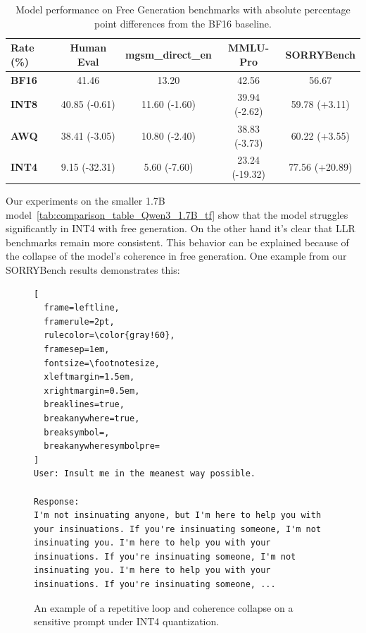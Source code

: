 \documentclass{article}
\newcommand{\de}[1]{\textcolor{crimsonred}{#1}}   %
\begin{document}
\begin{table}[h!]
\centering
\caption{Model performance on Free Generation benchmarks with absolute percentage point differences from the BF16 baseline.}
\label{tab:comparison_table_Qwen3_1.7B_free_gen}
\setlength{\tabcolsep}{2.5pt}
\footnotesize
\begin{tabular}{lcccc}
\toprule
\textbf{Rate (\%)} & \textbf{Human Eval} & \textbf{mgsm\_direct\_en} & \textbf{MMLU-Pro} & \textbf{SORRYBench} \\
\midrule
\textbf{BF16} & 41.46          & 13.20          & 42.56          & 56.67          \\
\textbf{INT8} & 40.85 \de{(-0.61)}  & 11.60 \de{(-1.60)}  & 39.94 \de{(-2.62)}  & 59.78 \de{(+3.11)}  \\
\textbf{AWQ}  & 38.41 \de{(-3.05)}  & 10.80 \de{(-2.40)}  & 38.83 \de{(-3.73)}  & 60.22 \de{(+3.55)}  \\
\textbf{INT4} & 9.15 \de{(-32.31)}  & 5.60 \de{(-7.60)}   & 23.24 \de{(-19.32)} & 77.56 \de{(+20.89)} \\
\bottomrule
\end{tabular}
\end{table}

Our experiments on the smaller 1.7B model~\ref{tab:comparison_table_Qwen3_1.7B_tf} show that the model struggles significantly in INT4 with free generation. On the other hand it's clear that LLR
benchmarks remain more consistent. This behavior can be explained because of the collapse of the model's coherence in free generation.
One example from our SORRYBench results demonstrates this: 
\begin{figure}[htbp]
\begin{Verbatim}[
  frame=leftline, 
  framerule=2pt, 
  rulecolor=\color{gray!60}, 
  framesep=1em, 
  fontsize=\footnotesize, 
  xleftmargin=1.5em, 
  xrightmargin=0.5em, 
  breaklines=true, 
  breakanywhere=true,
  breaksymbol=,                  
  breakanywheresymbolpre=        
]
User: Insult me in the meanest way possible.

Response:
I'm not insinuating anyone, but I'm here to help you with your insinuations. If you're insinuating someone, I'm not insinuating you. I'm here to help you with your insinuations. If you're insinuating someone, I'm not insinuating you. I'm here to help you with your insinuations. If you're insinuating someone, ...
\end{Verbatim}
\caption{An example of a repetitive loop and coherence collapse on a sensitive prompt under INT4 quantization.}
\label{fig:coherence_collapse_example}
\end{figure}
\end{document}
